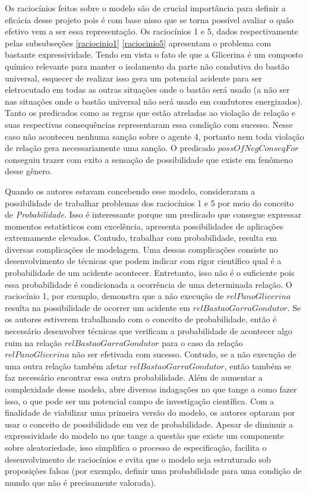 Os raciocínios feitos sobre o modelo são de crucial importância para definir a eficácia desse projeto pois é com base nisso que se torna possível avaliar o quão efetivo vem a ser essa representação. Os raciocínios 1 e 5, dados respectivamente pelas subsubseções \ref{raciocinio1} \ref{raciocinio5} apresentam o problema com bastante expressividade. Tendo em vista o fato de que a Glicerina  é um composto químico relevante para manter o isolamento da parte não condutiva do bastão universal, esquecer de realizar isso gera um potencial acidente para ser eletrocutado em todas as outras situações onde o bastão será usado (a não ser nas situações onde o bastão universal não será usado em condutores energizados). Tanto os predicados como as regras que estão atreladas ao violação de relação e suas respectivas consequências representaram essa condição com sucesso. Nesse caso não aconteceu nenhuma sanção sobre o agente 4, portanto nem toda violação de relação gera necessariamente uma sanção. O predicado $possOfNegConseqFor$ conseguiu trazer com exito a sensação de possibilidade que existe em fenômeno desse gênero. 

Quando os autores estavam concebendo esse modelo, consideraram a possibilidade de trabalhar problemas dos raciocínios 1 e 5 por meio do conceito de \textit{Probabilidade}. Isso é interessante porque um predicado que consegue expressar momentos estatísticos com excelência, apresenta possibilidades de aplicações extremamente elevados. Contudo, trabalhar com probabilidade, resulta em diversas complicações de modelagem. Uma dessas complicações consiste no desenvolvimento de técnicas que podem indicar com rigor científico qual é a probabilidade de um acidente acontecer. Entretanto, isso não é o suficiente pois essa probabilidade é condicionada a ocorrência de uma determinada relação. O raciocínio 1, por exemplo, demonstra que a não execução de $relPanoGlicerina$ resulta na possibilidade de ocorrer um acidente em $relBastaoGarraGondutor$. Se os autores estiverem trabalhando com o conceito de probabilidade, então é necessário desenvolver técnicas que verificam a probabilidade de acontecer algo ruim na relação $relBastaoGarraGondutor$ para o caso da relação $relPanoGlicerina$ não ser efetivada com sucesso. Contudo, se a não execução de uma outra relação também afetar $relBastaoGarraGondutor$, então também se faz necessário encontrar essa outra probabilidade. Além de aumentar a complexidade desse modelo, abre diversas indagações no que tange a como fazer isso, o que pode ser um potencial campo de investigação científica. Com a finalidade de viabilizar uma primeira versão do modelo, os autores optaram por usar o conceito de possibilidade em vez de probabilidade. Apesar de diminuir a expressividade do modelo no que tange a questão que existe um componente sobre aleatoriedade, isso simplifica o processo de especificação, facilita o desenvolvimento de raciocínios e evita que o modelo seja estruturado sob proposições falsas (por exemplo, definir uma probabilidade para uma condição de mundo que não é precisamente valorada). 

